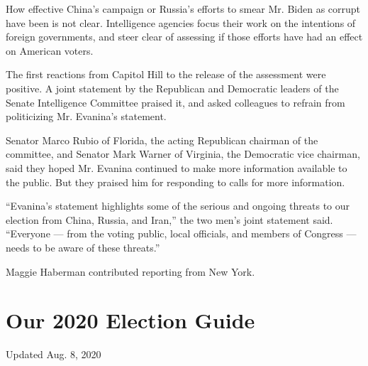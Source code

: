 How effective China's campaign or Russia's efforts to smear Mr. Biden as
corrupt have been is not clear. Intelligence agencies focus their work
on the intentions of foreign governments, and steer clear of assessing
if those efforts have had an effect on American voters.

The first reactions from Capitol Hill to the release of the assessment
were positive. A joint statement by the Republican and Democratic
leaders of the Senate Intelligence Committee praised it, and asked
colleagues to refrain from politicizing Mr. Evanina's statement.

Senator Marco Rubio of Florida, the acting Republican chairman of the
committee, and Senator Mark Warner of Virginia, the Democratic vice
chairman, said they hoped Mr. Evanina continued to make more information
available to the public. But they praised him for responding to calls
for more information.

``Evanina's statement highlights some of the serious and ongoing threats
to our election from China, Russia, and Iran,'' the two men's joint
statement said. ``Everyone --- from the voting public, local officials,
and members of Congress --- needs to be aware of these threats.''

Maggie Haberman contributed reporting from New York.

\hypertarget{our-2020-election-guide}{%
\section{Our 2020 Election Guide}\label{our-2020-election-guide}}

Updated Aug. 8, 2020

